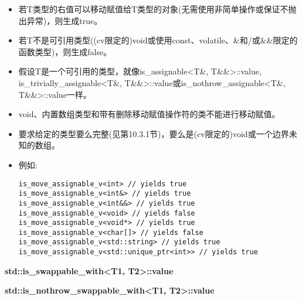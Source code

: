 \begin{itemize}
\item
若T类型的右值可以移动赋值给T类型的对象(无需使用非简单操作或保证不抛出异常)，则生成true。

\item
若T不是可引用类型((cv限定的)void或使用const、volatile、\&和/或\&\&限定的函数类型)，则生成false。

\item
假设T是一个可引用的类型，就像is\_assignable<T\&, T\&\&>::value, is\_trivially\_assignable<T\&, T\&\&>::value或is\_nothrow\_assignable<T\&, T\&\&>::value一样。

\item
void、内置数组类型和带有删除移动赋值操作符的类不能进行移动赋值。

\item
要求给定的类型要么完整(见第10.3.1节)，要么是(cv限定的)void或一个边界未知的数组。

\item
例如:
\begin{lstlisting}[style=styleCXX]
is_move_assignable_v<int> // yields true
is_move_assignable_v<int&> // yields true
is_move_assignable_v<int&&> // yields true
is_move_assignable_v<void> // yields false
is_move_assignable_v<void*> // yields true
is_move_assignable_v<char[]> // yields false
is_move_assignable_v<std::string> // yields true
is_move_assignable_v<std::unique_ptr<int>> // yields true
\end{lstlisting}
\end{itemize}

\textbf{std::is\_swappable\_with<T1, T2>::value}

\textbf{std::is\_nothrow\_swappable\_with<T1, T2>::value}


